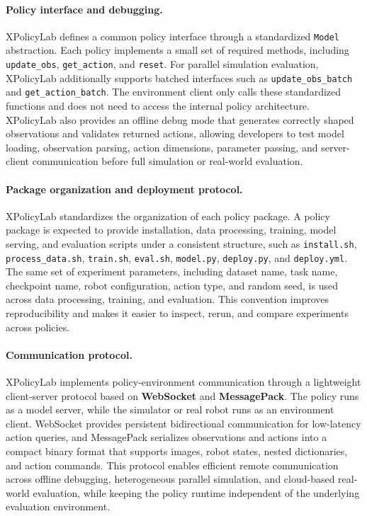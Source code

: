 \paragraph{Policy interface and debugging.}
XPolicyLab defines a common policy interface through a standardized \texttt{Model} abstraction. Each policy implements a small set of required methods, including \texttt{update\_obs}, \texttt{get\_action}, and \texttt{reset}. For parallel simulation evaluation, XPolicyLab additionally supports batched interfaces such as \texttt{update\_obs\_batch} and \texttt{get\_action\_batch}. The environment client only calls these standardized functions and does not need to access the internal policy architecture. XPolicyLab also provides an offline debug mode that generates correctly shaped observations and validates returned actions, allowing developers to test model loading, observation parsing, action dimensions, parameter passing, and server-client communication before full simulation or real-world evaluation.

\paragraph{Package organization and deployment protocol.}
XPolicyLab standardizes the organization of each policy package. A policy package is expected to provide installation, data processing, training, model serving, and evaluation scripts under a consistent structure, such as \texttt{install.sh}, \texttt{process\_data.sh}, \texttt{train.sh}, \texttt{eval.sh}, \texttt{model.py}, \texttt{deploy.py}, and \texttt{deploy.yml}. The same set of experiment parameters, including dataset name, task name, checkpoint name, robot configuration, action type, and random seed, is used across data processing, training, and evaluation. This convention improves reproducibility and makes it easier to inspect, rerun, and compare experiments across policies.

\paragraph{Communication protocol.}
\label{communication_protocol}
XPolicyLab implements policy-environment communication through a lightweight client-server protocol based on \textbf{WebSocket} and \textbf{MessagePack}. The policy runs as a model server, while the simulator or real robot runs as an environment client. WebSocket provides persistent bidirectional communication for low-latency action queries, and MessagePack serializes observations and actions into a compact binary format that supports images, robot states, nested dictionaries, and action commands. This protocol enables efficient remote communication across offline debugging, heterogeneous parallel simulation, and cloud-based real-world evaluation, while keeping the policy runtime independent of the underlying evaluation environment.

